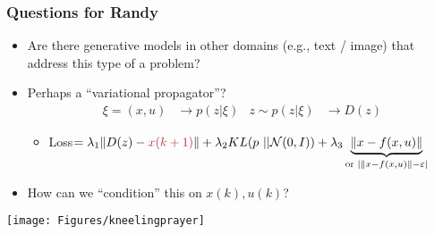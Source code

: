 \documentclass[aspectratio=169,handout]{beamer} 	%
\begin{document}
\begin{frame}
	\frametitle{Questions for Randy}
	
	\begin{minipage}{0.7\columnwidth}
	\begin{itemize}[<+->]
		\itemsep \baselineskip
		
		\item Are there generative models in other domains (e.g., text / image)
		that address this type of a problem?
		
		\item Perhaps a ``variational propagator''?
		\begin{align*}
			\xi=(x,u) &\rightarrow p(z | \xi) &
			z \sim p(z | \xi) &\rightarrow D(z)
		\end{align*}
		\begin{itemize}
			\item Loss$ = \lambda_1 \| D(z) - \mathalert{x(k+1)} \| + 
			\lambda_2 KL(p~|| \mathcal{N}(0,I) ) + \lambda_3 \underbrace{\|x - f(x,u)\|}_{\text{or } \left| \|x 
			- f(x,u) \| - \varepsilon \right|}$
		\end{itemize}
		
		\item How can we ``condition'' this on $x(k), u(k)$?
	\end{itemize}
	\end{minipage}
	\begin{minipage}{0.25\columnwidth}
		\centering
		\vspace*{2\baselineskip}
		\texttt{[image: Figures/kneelingprayer]}
	\end{minipage}


\end{frame}
\end{document}
